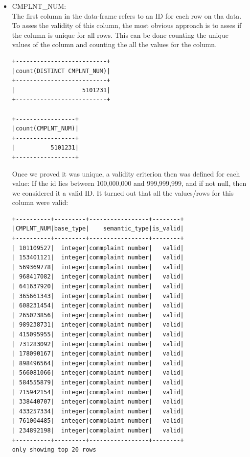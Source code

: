 \documentclass{article}
\begin{document}
\begin{itemize}
\item CMPLNT\_NUM: \\
The first column in the data-frame refers to an ID for each row on tha data. To asses the validity of this column, the most obvious approach is to asses if the column is unique for all rows. This can be done counting the unique values of the column and counting the all the values for the column. 

\begin{verbatim}
+--------------------------+                                             
|count(DISTINCT CMPLNT_NUM)|
+--------------------------+
|                   5101231|
+--------------------------+

+-----------------+                                                     
|count(CMPLNT_NUM)|
+-----------------+
|          5101231|
+-----------------+
\end{verbatim}

Once we proved it was unique, a validity criterion then was defined for each value: If the id lies between 100,000,000 and  999,999,999, and if not null, then we considered it a valid ID. It turned out that all the values/rows for this column were valid: 

\begin{verbatim}
+----------+---------+-----------------+--------+
|CMPLNT_NUM|base_type|    semantic_type|is_valid|
+----------+---------+-----------------+--------+
| 101109527|  integer|commplaint number|   valid|
| 153401121|  integer|commplaint number|   valid|
| 569369778|  integer|commplaint number|   valid|
| 968417082|  integer|commplaint number|   valid|
| 641637920|  integer|commplaint number|   valid|
| 365661343|  integer|commplaint number|   valid|
| 608231454|  integer|commplaint number|   valid|
| 265023856|  integer|commplaint number|   valid|
| 989238731|  integer|commplaint number|   valid|
| 415095955|  integer|commplaint number|   valid|
| 731283092|  integer|commplaint number|   valid|
| 178090167|  integer|commplaint number|   valid|
| 898496564|  integer|commplaint number|   valid|
| 566081066|  integer|commplaint number|   valid|
| 584555879|  integer|commplaint number|   valid|
| 715942154|  integer|commplaint number|   valid|
| 338440707|  integer|commplaint number|   valid|
| 433257334|  integer|commplaint number|   valid|
| 761004485|  integer|commplaint number|   valid|
| 234892198|  integer|commplaint number|   valid|
+----------+---------+-----------------+--------+
only showing top 20 rows


\end{verbatim}
\end{itemize}
\end{document}
